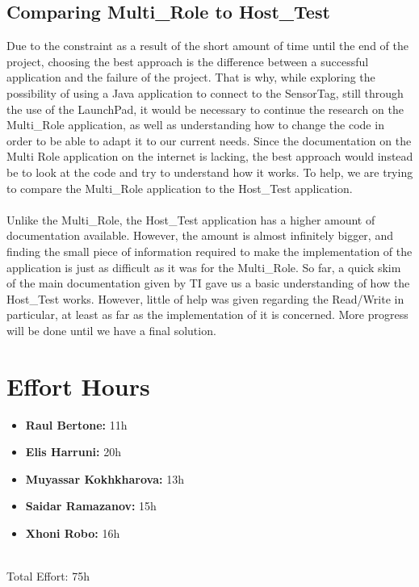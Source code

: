 \documentclass[12pt]{article}
\begin{document}
\subsection{Comparing Multi\_Role to Host\_Test}
Due to the constraint as a result of the short amount of time until the end of the project, choosing the best approach is the difference between a successful application and the failure of the project. That is why, while exploring the possibility of using a Java application to connect to the SensorTag, still through the use of the LaunchPad, it would be necessary to continue the research on the Multi\_Role application, as well as understanding how to change the code in order to be able to adapt it to our current needs. Since the documentation on the Multi Role application on the internet is lacking, the best approach would instead be to look at the code and try to understand how it works. To help, we are trying to compare the Multi\_Role application to the Host\_Test application.\\\\
Unlike the Multi\_Role, the Host\_Test application has a higher amount of documentation available. However, the amount is almost infinitely bigger, and finding the small piece of information required to make the implementation of the application is just as difficult as it was for the Multi\_Role. So far, a quick skim of the main documentation given by TI gave us a basic understanding of how the Host\_Test works. However, little of help was given regarding the Read/Write in particular, at least as far as the implementation of it is concerned. More progress will be done until we have a final solution.\\

\section{Effort Hours}
\begin{itemize}
	\item \textbf{Raul Bertone:} 11h
	\item \textbf{Elis Harruni:} 20h
	\item \textbf{Muyassar Kokhkharova:} 13h
	\item \textbf{Saidar Ramazanov:} 15h
	\item \textbf{Xhoni Robo:} 16h\\\\
\end{itemize}

Total Effort: 75h
\printbibliography
\end{document}
